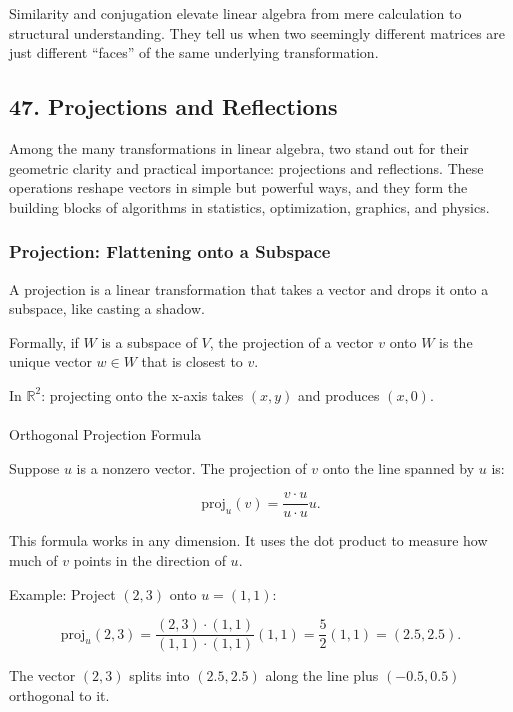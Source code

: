 \documentclass[
  letterpaper,
  DIV=11,
  numbers=noendperiod]{scrreprt}
\makeatletter
\let\oldparagraph\paragraph
\renewcommand{\paragraph}{
    \@ifstar
      \xxxParagraphStar
      \xxxParagraphNoStar
  }
\newcommand{\xxxParagraphStar}[1]{\oldparagraph*{#1}\mbox{}}
\newcommand{\xxxParagraphNoStar}[1]{\oldparagraph{#1}\mbox{}}
\makeatother
\begin{document}
Similarity and conjugation elevate linear algebra from mere calculation
to structural understanding. They tell us when two seemingly different
matrices are just different ``faces'' of the same underlying
transformation.

\subsection{47. Projections and
Reflections}\label{projections-and-reflections}

Among the many transformations in linear algebra, two stand out for
their geometric clarity and practical importance: projections and
reflections. These operations reshape vectors in simple but powerful
ways, and they form the building blocks of algorithms in statistics,
optimization, graphics, and physics.

\subsubsection{Projection: Flattening onto a
Subspace}\label{projection-flattening-onto-a-subspace}

A projection is a linear transformation that takes a vector and drops it
onto a subspace, like casting a shadow.

Formally, if \(W\) is a subspace of \(V\), the projection of a vector
\(v\) onto \(W\) is the unique vector \(w \in W\) that is closest to
\(v\).

In \(\mathbb{R}^2\): projecting onto the x-axis takes \((x,y)\) and
produces \((x,0)\).

\paragraph{Orthogonal Projection
Formula}\label{orthogonal-projection-formula}

Suppose \(u\) is a nonzero vector. The projection of \(v\) onto the line
spanned by \(u\) is:

\[
\text{proj}_u(v) = \frac{v \cdot u}{u \cdot u} u.
\]

This formula works in any dimension. It uses the dot product to measure
how much of \(v\) points in the direction of \(u\).

Example: Project \((2,3)\) onto \(u=(1,1)\):

\[
\text{proj}_u(2,3) = \frac{(2,3)\cdot(1,1)}{(1,1)\cdot(1,1)} (1,1) = \frac{5}{2}(1,1) = (2.5,2.5).
\]

The vector \((2,3)\) splits into \((2.5,2.5)\) along the line plus
\((-0.5,0.5)\) orthogonal to it.
\end{document}
